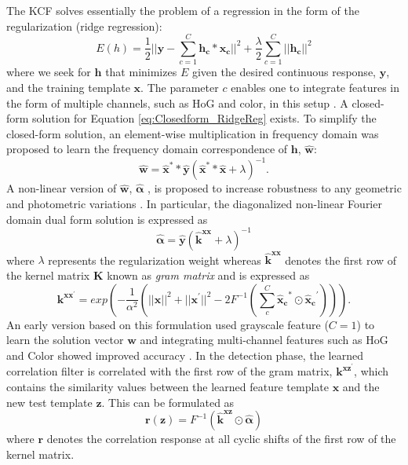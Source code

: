 \documentclass[10pt,twocolumn,letterpaper]{article}
\begin{document}
The KCF solves essentially the problem of a regression in the form of
the regularization (ridge regression):
\begin{equation}
E(h) = \frac{1}{2}||\mathbf{y}-\sum_{c=1}^{C}\mathbf{h_{c}}*\mathbf{x_{c}}||^{2} + \frac{\lambda}{2}\sum_{c=1}^{C}||\mathbf{h_{c}}||^{2}
\label{eq:Closedform_RidgeReg}
\end{equation}
where we seek for $\mathbf{h}$ that minimizes $E$ given the desired 
continuous response, $\mathbf{y}$, and the training template $\mathbf{x}$. 
The parameter $c$ enables one to integrate features in the form of 
multiple channels, such as HoG and color, in this setup \cite{henriques2015high,galoogahi2013multi}. 
A closed-form solution for Equation \ref{eq:Closedform_RidgeReg} exists. To simplify the
closed-form solution, an element-wise multiplication in
frequency domain was proposed to learn the frequency domain correspondence of $\mathbf{h}$, $\mathbf{\hat{w}}$:
\begin{equation}
\mathbf{\hat{w}} = \mathbf{\hat{x}^{*}}*\mathbf{\hat{y}}(\mathbf{\hat{x}^{*}}*\mathbf{\hat{x}}+\lambda)^{-1}.
\label{eq:DiagonalizedPrimalSolution}
\end{equation}
A non-linear version of $\mathbf{\hat{w}}$, $\mathbf{\hat{\alpha}}$ , is proposed to increase robustness
to any geometric and photometric variations
\cite{henriques2015high}. In particular, the diagonalized non-linear Fourier
domain dual form solution is expressed as
\begin{equation}
\mathbf{\hat{\alpha}} = \mathbf{\hat{y}}(\mathbf{\hat{k}^{xx}}+\lambda)^{-1}
\label{eq:FourierDualDomainSolution}
\end{equation}
where $\lambda$ represents the regularization weight whereas $\mathbf{\hat{k}^{xx}}$ denotes
 the first row of the kernel matrix $\mathbf{K}$ known as \textit{gram matrix} and is expressed as
\begin{equation}
\mathbf{k^{xx^{'}}} = exp(-\dfrac{1}{\alpha^{2}}(||\mathbf{x}||^{2}+||\mathbf{x}^{'}||^{2}-2F^{-1}(\sum^{C}_{c}\mathbf{\hat{x}_{c}}^{*}\odot \mathbf{\hat{x}_{c}}^{'}))).
\label{eq:GaussianCorrelationSingleChannel}
\end{equation}
An early version based on this formulation used grayscale feature
($C=1$) to learn the solution vector $\mathbf{w}$ and integrating multi-channel features
such as HoG and Color showed improved accuracy
\cite{henriques2015high,galoogahi2013multi,tang2015multi,ma2015long,bibi2015multi}. 
In the detection phase,  the learned correlation filter is correlated with the first row of the gram matrix,
$\mathbf{k^{xz^{'}}}$, which contains the similarity values between the learned feature template $\mathbf{x}$
and the new test template $\mathbf{z}$. This can be formulated as
\begin{equation}
\mathbf{r(z)} = F^{-1}(\mathbf{\hat{k}^{xz}} \odot \mathbf{\hat{\alpha}})
\end{equation}
where $\mathbf{r}$ denotes the correlation response at all cyclic shifts of the
first row of the kernel matrix.
\end{document}
